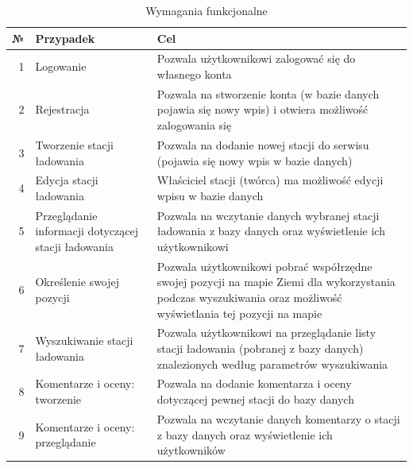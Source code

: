 \begin{table}[htb] \small
\centering
    \caption{Wymagania funkcjonalne}
    \label{tab:wymaganiafunkcjonalne}
    \begin{tabularx}{\linewidth}{| r | p{4.5cm} | X |} 
    \hline
    № & Przypadek & Cel \\
    \hline
    1 & Logowanie & Pozwala użytkownikowi zalogować się do własnego konta \\ 
    \hline
    2 & Rejestracja & Pozwala na stworzenie konta (w bazie danych pojawia się nowy wpis) i otwiera możliwość zalogowania się \\ 
    \hline
    3 & Tworzenie stacji ładowania & Pozwala na dodanie nowej stacji do serwisu (pojawia się nowy wpis w bazie danych) \\
    \hline
    4 & Edycja stacji ładowania & Właściciel stacji (twórca) ma możliwość edycji wpisu w bazie danych \\
    \hline
    5 & Przeglądanie informacji dotyczącej stacji ładowania & Pozwala na wczytanie danych wybranej stacji ładowania z bazy danych oraz wyświetlenie ich użytkownikowi \\
    \hline
    6 & Określenie swojej pozycji & Pozwala użytkownikowi pobrać współrzędne swojej pozycji na mapie Ziemi dla wykorzystania podczas wyszukiwania oraz możliwość wyświetlania tej pozycji na mapie \\
    \hline
    7 & Wyszukiwanie stacji ładowania & Pozwala użytkownikowi na przeglądanie listy stacji ładowania (pobranej z bazy danych) znalezionych według parametrów wyszukiwania \\
    \hline
    8 & Komentarze i oceny: tworzenie  & Pozwala na dodanie komentarza i oceny dotyczącej pewnej stacji do bazy danych \\
    \hline
    9 & Komentarze i oceny: przeglądanie  & Pozwala na wczytanie danych komentarzy o stacji z bazy danych oraz wyświetlenie ich użytkowników \\
    \hline
\end{tabularx}
\end{table}


